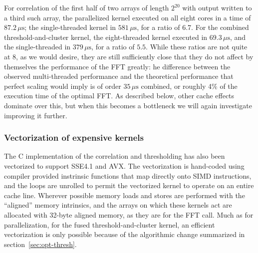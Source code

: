 For correlation of the first half of two arrays of length $2^{20}$ with output
written to a third such array, the parallelized kernel executed on all eight
cores in a time of $87.2\,\mu\mathrm{s}$; the single-threaded kernel in
$581\,\mu\mathrm{s}$, for a ratio of 6.7.  For the combined
threshold-and-cluster kernel, the eight-threaded kernel executed in
$69.3\,\mu\mathrm{s}$, and the single-threaded in $379\,\mu\mathrm{s}$, for a
ratio of $5.5$.  While these ratios are not quite at 8, as we would desire, they
are still sufficiently close that they do not affect by themselves the
performance of the FFT greatly: he difference between the observed
multi-threaded performance and the theoretical performance that perfect scaling
would imply is of order $35\,\mu\mathrm{s}$ combined, or roughly 4\% of the
execution time of the optimal FFT. As described below, other cache effects
dominate over this, but when this becomes a bottleneck we will again investigate
improving it further.

\vspace*{-10pt}
\subsubsection{Vectorization of expensive kernels}
\vspace*{-05pt}
\label{sec:vect-expens-kern}

The C implementation of the correlation and thresholding has also been vectorized to
support SSE4.1 and AVX. 
The vectorization is hand-coded using compiler
provided instrinsic functions that map directly onto SIMD instructions, and the
loops are unrolled to permit the vectorized kernel to operate on an entire cache
line. Wherever possible memory loads and stores are performed with the
``aligned'' memory intrinsics, and the arrays on which these kernels act are
allocated with 32-byte aligned memory, as they are for the FFT call. Much as for
parallelization, for the fused threshold-and-cluster kernel, an efficient
vectorization is only possible because of the algorithmic change summarized in
section~\ref{sec:opt-thresh}. 

